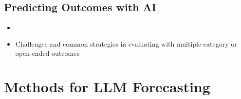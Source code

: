 \documentclass[12pt,a4paper]{article}
\begin{document}
\subsection*{Predicting Outcomes with AI \DOMAINCAPITALIZEDINTERVENTION}
\begin{itemize}
  \item \PREDICTINGOUTCOMES
  \item Challenges and common strategies in evaluating with multiple‑category or open‑ended outcomes   
\end{itemize}

\section*{Methods for LLM Forecasting}
\end{document}
